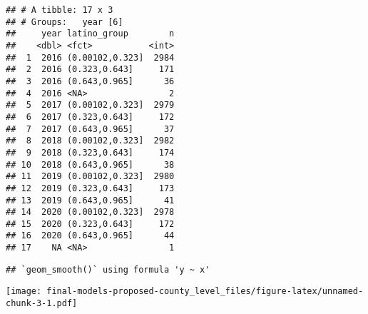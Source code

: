\documentclass[
]{article}
\newenvironment{Shaded}{\begin{snugshade}}{\end{snugshade}}
\newcommand{\CommentTok}[1]{\textcolor[rgb]{0.56,0.35,0.01}{\textit{#1}}}
\newcommand{\DataTypeTok}[1]{\textcolor[rgb]{0.13,0.29,0.53}{#1}}
\newcommand{\DecValTok}[1]{\textcolor[rgb]{0.00,0.00,0.81}{#1}}
\newcommand{\KeywordTok}[1]{\textcolor[rgb]{0.13,0.29,0.53}{\textbf{#1}}}
\newcommand{\NormalTok}[1]{#1}
\newcommand{\OperatorTok}[1]{\textcolor[rgb]{0.81,0.36,0.00}{\textbf{#1}}}
\newcommand{\OtherTok}[1]{\textcolor[rgb]{0.56,0.35,0.01}{#1}}
\newcommand{\StringTok}[1]{\textcolor[rgb]{0.31,0.60,0.02}{#1}}
\begin{document}
\begin{verbatim}
## # A tibble: 17 x 3
## # Groups:   year [6]
##     year latino_group        n
##    <dbl> <fct>           <int>
##  1  2016 (0.00102,0.323]  2984
##  2  2016 (0.323,0.643]     171
##  3  2016 (0.643,0.965]      36
##  4  2016 <NA>                2
##  5  2017 (0.00102,0.323]  2979
##  6  2017 (0.323,0.643]     172
##  7  2017 (0.643,0.965]      37
##  8  2018 (0.00102,0.323]  2982
##  9  2018 (0.323,0.643]     174
## 10  2018 (0.643,0.965]      38
## 11  2019 (0.00102,0.323]  2980
## 12  2019 (0.323,0.643]     173
## 13  2019 (0.643,0.965]      41
## 14  2020 (0.00102,0.323]  2978
## 15  2020 (0.323,0.643]     172
## 16  2020 (0.643,0.965]      44
## 17    NA <NA>                1
\end{verbatim}

\begin{Shaded}
\end{Shaded}

\begin{verbatim}
## `geom_smooth()` using formula 'y ~ x'
\end{verbatim}

\texttt{[image: final-models-proposed-county\_level\_files/figure-latex/unnamed-chunk-3-1.pdf]}
\end{document}
